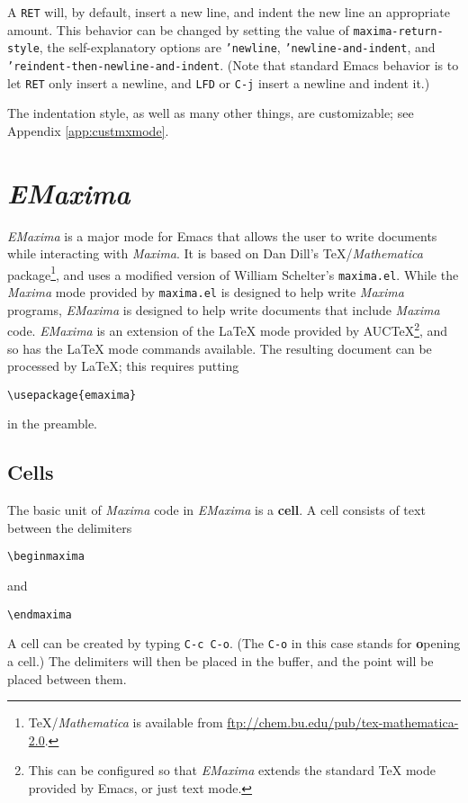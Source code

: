 \documentclass{article}
\newcommand{\emx}{\textsl{\sffamily EMaxima}}
\newcommand{\mx}{\textsl{\sffamily Maxima}}
\begin{document}
A \texttt{RET} will, by default, insert a new line, and indent the new
line an appropriate amount.  This behavior can be changed by setting
the value of 
\texttt{maxima-return-style}, the self-explanatory options are
\texttt{'newline}, \texttt{'newline-and-indent}, and
\texttt{'reindent-then-newline-and-indent}.  (Note that standard Emacs
behavior is to let \texttt{RET} only insert a newline, and
\texttt{LFD} or \texttt{C-j} insert a newline and indent it.)

The indentation style, as well as many other things, are customizable;
see Appendix \ref{app:custmxmode}.


\section{\emx}

\emx{} is a major mode for Emacs that allows the user to write
documents while interacting with \mx.  It is based on Dan Dill's
\TeX{}/\textit{Mathematica} package\footnote{\TeX/\textit{Mathematica}
  is available from \url{ftp://chem.bu.edu/pub/tex-mathematica-2.0}.},
and uses a modified version of William Schelter's \texttt{maxima.el}.
While the \mx{} mode provided by \texttt{maxima.el} is designed to
help write \mx{} programs, \emx{} is designed to help write documents
that include \mx{} code.  \emx{} is an extension of the \LaTeX{} mode
provided by AUC\TeX{}\footnote{This can be configured so that \emx{}
  extends the standard \TeX{} mode provided by Emacs, or just text
  mode.}, and so has the \LaTeX{} mode commands available.  The
resulting document can be processed by \LaTeX{}; this requires putting
\begin{verbatim}
\usepackage{emaxima}
\end{verbatim}
\noindent
in the preamble.

\subsection{Cells}

The basic unit of \mx{} code in \emx{} is a \textbf{cell}.  A cell
consists of text between the delimiters
\begin{verbatim}
\beginmaxima
\end{verbatim}
\noindent
and
\begin{verbatim}
\endmaxima
\end{verbatim}
\noindent
A cell can be created by typing \texttt{C-c C-o}.  (The \texttt{C-o} in this
case stands for \textbf{o}pening a cell.)  The delimiters will then be
placed in the buffer, and the point will be placed between them.
\end{document}
